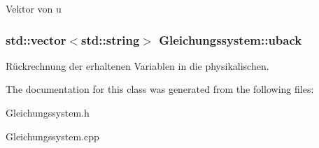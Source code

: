 Vektor von u \hypertarget{classGleichungssystem_a8b6e15e8bd9149de3cbf49c6aca116bc}{
\subsubsection[{uback}]{\setlength{\rightskip}{0pt plus 5cm}std\-::vector$<$std\-::string$>$ Gleichungssystem\-::uback}}\label{classGleichungssystem_a8b6e15e8bd9149de3cbf49c6aca116bc}
Rückrechnung der erhaltenen Variablen in die physikalischen. 

The documentation for this class was generated from the following files\-:\begin{DoxyCompactItemize}
\item 
Gleichungssystem.\-h\item 
Gleichungssystem.\-cpp\end{DoxyCompactItemize}
